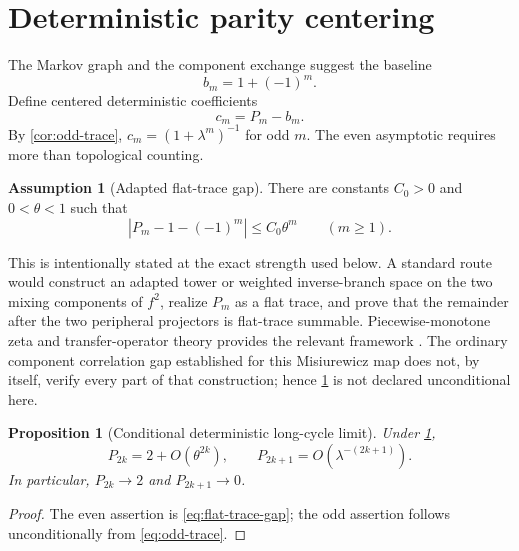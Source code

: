 \documentclass[11pt]{article}
\newtheorem{proposition}[theorem]{Proposition}
\theoremstyle{definition}
\newtheorem{assumption}[theorem]{Assumption}
\theoremstyle{remark}
\begin{document}
\section{Deterministic parity centering}
\label{sec:deterministic-centering}

The Markov graph and the component exchange suggest the baseline
\begin{equation}\label{eq:parity-baseline}
 b_m=1+(-1)^m.
\end{equation}
Define centered deterministic coefficients
\begin{equation}\label{eq:centered-coefficients}
 c_m=P_m-b_m.
\end{equation}
By \cref{cor:odd-trace}, $c_m=(1+\lambda^m)^{-1}$ for odd $m$.  The even
asymptotic requires more than topological counting.

\begin{assumption}[Adapted flat-trace gap]
\label{ass:flat-trace-gap}
There are constants $C_0>0$ and $0<\theta<1$ such that
\begin{equation}\label{eq:flat-trace-gap}
 |P_m-1-(-1)^m|\le C_0\theta^m
 \qquad(m\ge1).
\end{equation}
\end{assumption}

This is intentionally stated at the exact strength used below.  A standard
route would construct an adapted tower or weighted inverse-branch space on
the two mixing components of $f^2$, realize $P_m$ as a flat trace, and prove
that the remainder after the two peripheral projectors is flat-trace
summable.  Piecewise-monotone zeta and transfer-operator theory provides the
relevant framework \citep{BaladiKeller1990,Baladi2000,Baladi2018}.  The
ordinary component correlation gap established for this Misiurewicz map does
not, by itself, verify every part of that construction; hence
\cref{ass:flat-trace-gap} is not declared unconditional here.

\begin{proposition}[Conditional deterministic long-cycle limit]
\label{prop:deterministic-limit}
Under \cref{ass:flat-trace-gap},
\begin{equation}\label{eq:deterministic-parity-limit}
 P_{2k}=2+O(\theta^{2k}),
 \qquad
 P_{2k+1}=O(\lambda^{-(2k+1)}).
\end{equation}
In particular, $P_{2k}\to2$ and $P_{2k+1}\to0$.
\end{proposition}

\begin{proof}
The even assertion is \eqref{eq:flat-trace-gap}; the odd assertion follows
unconditionally from \eqref{eq:odd-trace}.
\end{proof}
\end{document}
